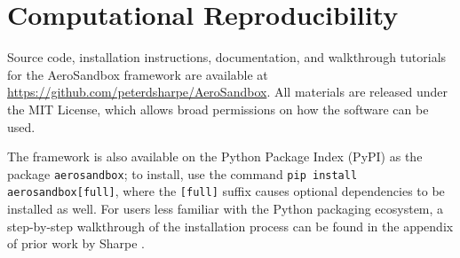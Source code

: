\section{Computational Reproducibility}
\label{sec:asb-reproducibility}

Source code, installation instructions, documentation, and walkthrough tutorials for the AeroSandbox framework are available at \url{https://github.com/peterdsharpe/AeroSandbox}. All materials are released under the MIT License, which allows broad permissions on how the software can be used.

The framework is also available on the Python Package Index (PyPI) as the package \texttt{aerosandbox}; to install, use the command \texttt{pip install aerosandbox[full]}, where the \texttt{[full]} suffix causes optional dependencies to be installed as well. For users less familiar with the Python packaging ecosystem, a step-by-step walkthrough of the installation process can be found in the appendix of prior work by Sharpe \cite{sharpe_aerosandbox_2021}.
